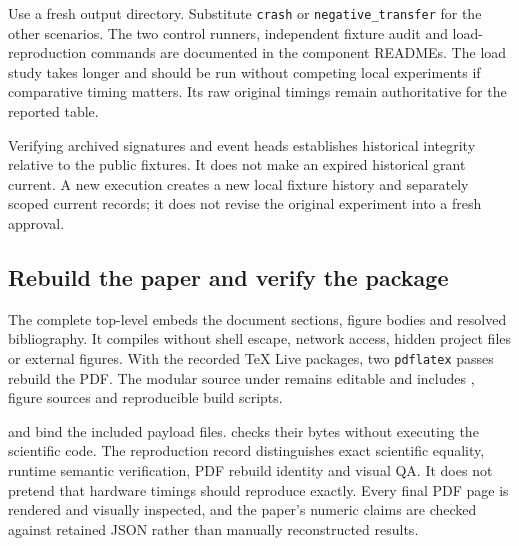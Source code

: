 \documentclass[11pt]{article}
\newcommand{\code}[1]{\texttt{#1}}
\begin{document}
Use a fresh output directory. Substitute \code{crash} or \code{negative\_transfer} for the other scenarios. The two control runners, independent fixture audit and load-reproduction commands are documented in the component READMEs. The load study takes longer and should be run without competing local experiments if comparative timing matters. Its raw original timings remain authoritative for the reported table.

Verifying archived signatures and event heads establishes historical integrity relative to the public fixtures. It does not make an expired historical grant current. A new execution creates a new local fixture history and separately scoped current records; it does not revise the original experiment into a fresh approval.

\subsection{Rebuild the paper and verify the package}

The complete top-level  embeds the document sections, figure bodies and resolved bibliography. It compiles without shell escape, network access, hidden project files or external figures. With the recorded TeX Live packages, two \code{pdflatex} passes rebuild the PDF. The modular source under  remains editable and includes , figure sources and reproducible build scripts.

 and  bind the included payload files.  checks their bytes without executing the scientific code. The reproduction record distinguishes exact scientific equality, runtime semantic verification, PDF rebuild identity and visual QA. It does not pretend that hardware timings should reproduce exactly. Every final PDF page is rendered and visually inspected, and the paper's numeric claims are checked against retained JSON rather than manually reconstructed results.
\end{document}

